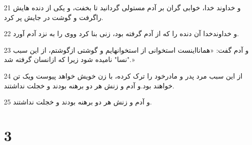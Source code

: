 \par 21 و خداوند خدا، خوابی گران بر آدم مستولی گردانید تا بخفت، و یکی از دنده هایش راگرفت و گوشت در جایش پر کرد.
\par 22 و خداوندخدا آن دنده را که از آدم گرفته بود، زنی بنا کرد ووی را به نزد آدم آورد.
\par 23 و آدم گفت: «همانااینست استخوانی از استخوانهایم و گوشتی ازگوشتم، از این سبب "نسا" نامیده شود زیرا که ازانسان گرفته شد.»
\par 24 از این سبب مرد پدر و مادرخود را ترک کرده، با زن خویش خواهد پیوست ویک تن خواهند بود.و آدم و زنش هر دو برهنه بودند و خجلت نداشتند.
\par 25 و آدم و زنش هر دو برهنه بودند و خجلت نداشتند.
 
\chapter{3}

